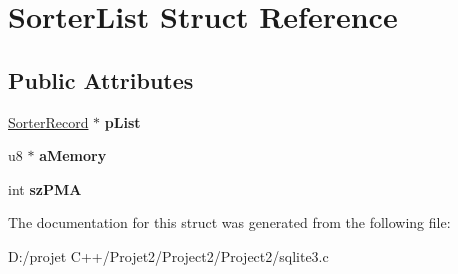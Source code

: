 \hypertarget{struct_sorter_list}{}\section{Sorter\+List Struct Reference}
\label{struct_sorter_list}
\subsection*{Public Attributes}
\begin{DoxyCompactItemize}
\item 
\mbox{\label{struct_sorter_list_a913640b1b917acccd7a851483f9d4e2b}} 
\mbox{\hyperlink{struct_sorter_record}{Sorter\+Record}} $\ast$ {\bfseries p\+List}
\item 
\mbox{\label{struct_sorter_list_ae0c7c3714fd8c61b806a5767ce686344}} 
u8 $\ast$ {\bfseries a\+Memory}
\item 
\mbox{\label{struct_sorter_list_a4d14b7e48b155f6b79dd6fd37645b73c}} 
int {\bfseries sz\+P\+MA}
\end{DoxyCompactItemize}


The documentation for this struct was generated from the following file\+:\begin{DoxyCompactItemize}
\item 
D\+:/projet C++/\+Projet2/\+Project2/\+Project2/sqlite3.\+c\end{DoxyCompactItemize}
